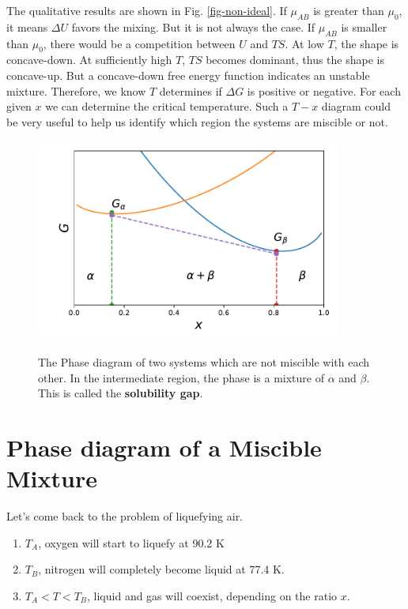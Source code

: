 The qualitative results are shown in Fig. \ref{fig-non-ideal}. If $\mu_{AB}$ is greater than $\mu_0$, it means $\Delta{U}$ favors the mixing. But it is not always the case. If $\mu_{AB}$ is smaller than $\mu_0$, there would be a competition between $U$ and $TS$. At low $T$, the shape is concave-down. At sufficiently high $T$, $TS$ becomes dominant, thus the shape is concave-up. But a concave-down free energy function indicates an unstable mixture. Therefore, we know $T$ determines if $\Delta{G}$ is positive or negative. For each given $x$ we can determine the critical temperature. Such a $T-x$ diagram could be very useful to help us identify which region the systems are miscible or not.

\begin{figure}[ht]
\centering
\includegraphics[width=10cm]{imgs/two-solids.pdf}
\label{fig-calc}
\caption{The Phase diagram of two systems which are not miscible with each other. In the intermediate region, the phase is a mixture of $\alpha$ and $\beta$.
This is called the \textbf{solubility gap}.}
\end{figure}


\section{Phase diagram of a Miscible Mixture}
Let's come back to the problem of liquefying air. 
\begin{enumerate}
\item $T_A$, oxygen will start to liquefy at 90.2 K 
\item $T_B$, nitrogen will completely become liquid at 77.4 K. 
\item $T_A<T<T_B$, liquid and gas will coexist, depending on the ratio $x$.
\end{enumerate}


